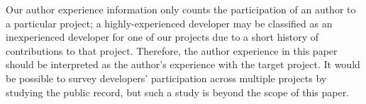 Our author experience information only counts the participation of an author to
a particular project; a highly-experienced developer may be classified as an
inexperienced developer for one of our projects due to a short history of
contributions to that project. %
Therefore, the author experience in this paper should be interpreted as the 
author's experience with the target project. 
It would be possible to
survey developers' participation across multiple projects by studying the public
record, but such a study is beyond the scope of this paper.
